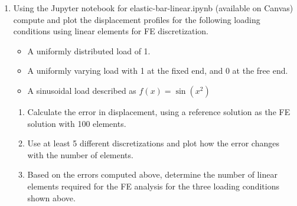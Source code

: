 \documentclass[a4paper,12pt]{article}
\begin{document}
\begin{enumerate}
	
	\item Using the Jupyter notebook for elastic-bar-linear.ipynb (available on Canvas) compute and plot the displacement profiles for the following loading conditions using linear elements for FE discretization. 
	
		\begin{itemize}
			\item A uniformly distributed load of 1.
			\item A uniformly varying load with 1 at the fixed end, and 0 at the free end.
			\item A sinusoidal load described as $f(x) = \sin(x^2)$
		\end{itemize}
	
		\begin{enumerate}
			\item Calculate the error in displacement, using a reference solution as the FE solution with 100 elements. 
			\item Use at least 5 different discretizations and plot how the error changes with the number of elements.
			\item Based on the errors computed above, determine the number of linear elements required for the FE analysis for the three loading conditions shown above.
		\end{enumerate}
	
\end{enumerate}
\end{document}
